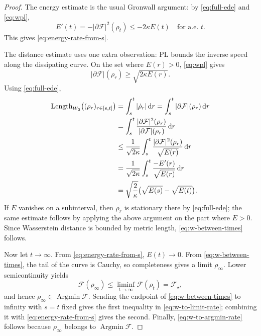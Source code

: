 \documentclass[11pt]{article}
\theoremstyle{definition}
\newcommand{\F}{\mathcal F}
\newcommand{\W}{W_2}
\begin{document}
\begin{proof}
The energy estimate is the usual Gronwall argument: by \eqref{eq:full-ede} and \eqref{eq:wpl},
\[
        E'(t)=-|\partial\F|^2(\rho_t)\le -2\kappa E(t)
        \quad\text{for a.e. }t.
\]
This gives \eqref{eq:energy-rate-from-s}.

The distance estimate uses one extra observation: PL bounds the inverse speed along the dissipating curve. On the set where $E(r)>0$, \eqref{eq:wpl} gives
\[
        |\partial\F|(\rho_r)
        \ge \sqrt{2\kappa E(r)}.
\]
Using \eqref{eq:full-ede},
\begin{align*}
        \operatorname{Length}_{\W}\bigl((\rho_r)_{r\in[s,t]}\bigr)
        &=\int_s^t |\dot\rho_r|\,{\rm d}r
          =\int_s^t |\partial\F|(\rho_r)\,{\rm d}r \\
        &=\int_s^t \frac{|\partial\F|^2(\rho_r)}{|\partial\F|(\rho_r)}\,{\rm d}r \\
        &\le
          \frac{1}{\sqrt{2\kappa}}
          \int_s^t \frac{|\partial\F|^2(\rho_r)}{\sqrt{E(r)}}\,{\rm d}r \\
        &=\frac{1}{\sqrt{2\kappa}}
          \int_s^t \frac{-E'(r)}{\sqrt{E(r)}}\,{\rm d}r \\
        &=\sqrt{\frac{2}{\kappa}}\bigl(\sqrt{E(s)}-\sqrt{E(t)}\bigr).
\end{align*}
If $E$ vanishes on a subinterval, then $\rho_r$ is stationary there by \eqref{eq:full-ede}; the same estimate follows by applying the above argument on the part where $E>0$.
Since Wasserstein distance is bounded by metric length, \eqref{eq:w-between-times} follows.

Now let $t\to\infty$. From \eqref{eq:energy-rate-from-s}, $E(t)\to0$. From \eqref{eq:w-between-times}, the tail of the curve is Cauchy, so completeness gives a limit $\rho_\infty$. Lower semicontinuity yields
\[
        \F(\rho_\infty)
        \le \liminf_{t\to\infty}\F(\rho_t)
        =\F_\star,
\]
and hence $\rho_\infty\in\operatorname{Argmin}\F$. Sending the endpoint of \eqref{eq:w-between-times} to infinity with $s=t$ fixed gives the first inequality in \eqref{eq:w-to-limit-rate}; combining it with \eqref{eq:energy-rate-from-s} gives the second. Finally, \eqref{eq:w-to-argmin-rate} follows because $\rho_\infty$ belongs to $\operatorname{Argmin}\F$.
\end{proof}
\end{document}
